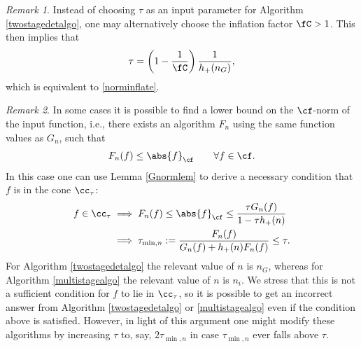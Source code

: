 \documentclass[]{elsarticle}
\theoremstyle{definition}
\theoremstyle{remark}
\newtheorem{rem}{Remark}
\newcommand{\Fnorm}[1]{\abs{#1}_{\cf}}
\begin{document}
\begin{rem} Instead of choosing $\tau$ as an input parameter for Algorithm \ref{twostagedetalgo}, one may alternatively choose the inflation factor $\fC >1$.  This then implies that 
\begin{equation} \label{taufromnC}
\tau = \left(1 - \frac{1}{\fC}\right)\frac{1}{h_{+}(n_G)},
\end{equation}
which is equivalent to \eqref{norminflate}.
\end{rem}

\begin{rem} \label{neccondrem} In some cases it is possible to find a lower bound on the $\cf$-norm of the input function, i.e., there exists an algorithm $F_n$ using the same function values as $G_n$, such that
\[
F_n(f) \le \Fnorm{f} \qquad \forall f \in \cf.
\]
In this case one can use Lemma \ref{Gnormlem} to derive a necessary condition that $f$ is in the cone $\cc_\tau$:
\begin{align}
\nonumber
f \in \cc_\tau 
& \implies F_n(f) \le \Fnorm{f} \le \frac{\tau G_n(f)}{1-\tau h_+(n)}\\
& \implies \tau_{\min,n}:= \frac{F_n(f)}{G_n(f) + h_+(n) F_n(f)} \le \tau.
\label{neccondFn}
\end{align}
For Algorithm \ref{twostagedetalgo} the relevant value of $n$ is $n_G$, whereas for Algorithm \ref{multistagealgo} the relevant value of $n$ is $n_i$.
We stress that this is not a sufficient condition for $f$ to lie in $\cc_{\tau}$, so it is possible to get an incorrect answer from Algorithm \ref{twostagedetalgo} or \ref{multistagealgo} even if the condition above is satisfied.  However, in light of this argument one might modify these algorithms by increasing $\tau$ to, say, $2 \tau_{\min,n}$ in case $\tau_{\min,n}$ ever falls above $\tau$. 
\end{rem}
\end{document}
